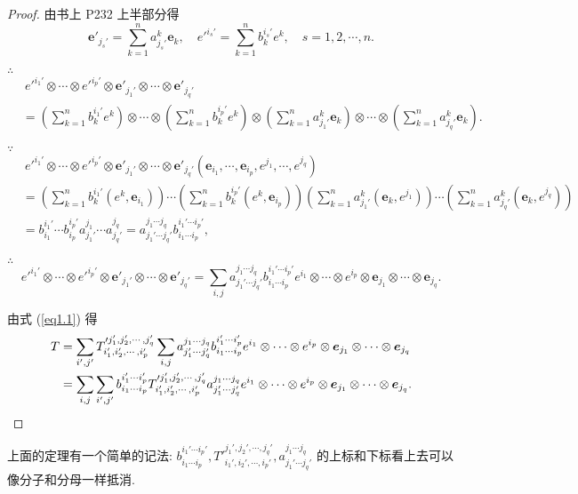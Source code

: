 \documentclass[color=black,device=normal,lang=cn,mode=geye]{elegantnote}
\begin{document}
\begin{proof}
    由书上 P232 上半部分得
    \[\boldsymbol{e}'_{j_s'}=\sum\limits_{k=1}^na_{j_s'}^k\boldsymbol{e}_k,\quad e'^{i_s'}=\sum\limits_{k=1}^nb_k^{i_s'}e^k,\quad s=1,2,\cdots,n.\]

    $\therefore$
    \begin{align*}
        & \ e'^{i_1'}\otimes\cdots\otimes e'^{i_p'}\otimes\boldsymbol{e}'_{j_1'}\otimes\cdots\otimes\boldsymbol{e}'_{j_q'} \\
        & =\left(\sum\limits_{k=1}^nb_k^{i_1'}e^k\right)\otimes\cdots\otimes\left(\sum\limits_{k=1}^nb_k^{i_p'}e^k\right)\otimes\left(\sum\limits_{k=1}^na_{j_1'}^k\boldsymbol{e}_k\right)\otimes\cdots\otimes\left(\sum\limits_{k=1}^na_{j_q'}^k\boldsymbol{e}_k\right).
    \end{align*}

    $\because$
    \begin{align*}
        & \ e'^{i_1'}\otimes\cdots\otimes e'^{i_p'}\otimes\boldsymbol{e}'_{j_1'}\otimes\cdots\otimes\boldsymbol{e}'_{j_q'}(\boldsymbol{e}_{i_1},\cdots,\boldsymbol{e}_{i_p},e^{j_1},\cdots,e^{j_q}) \\
        & =\left(\sum\limits_{k=1}^nb_k^{i_1'}(e^k,\boldsymbol{e}_{i_1})\right)\cdots\left(\sum\limits_{k=1}^nb_k^{i_p'}(e^k,\boldsymbol{e}_{i_p})\right)\left(\sum\limits_{k=1}^na_{j_1'}^k(\boldsymbol{e}_k,e^{j_1})\right)\cdots\left(\sum\limits_{k=1}^na_{j_q'}^k(\boldsymbol{e}_k,e^{j_q})\right) \\
        & =b^{i_1'}_{i_1}\cdots b^{i_p'}_{i_p}a^{j_1}_{j_1'}\cdots a^{j_q}_{j_q'}=a^{j_1\cdots j_q}_{j_1'\cdots j_q'}b^{i_1'\cdots i_p'}_{i_1\cdots i_p},
    \end{align*}

    $\therefore$
    \[e'^{i_1'}\otimes\cdots\otimes e'^{i_p'}\otimes\boldsymbol{e}'_{j_1'}\otimes\cdots\otimes\boldsymbol{e}'_{j_q'}=\sum\limits_{i,j}a^{j_1\cdots j_q}_{j_1'\cdots j_q'}b^{i_1'\cdots i_p'}_{i_1\cdots i_p}e^{i_1}\otimes\cdots\otimes e^{i_p}\otimes\boldsymbol{e}_{j_1}\otimes\cdots\otimes\boldsymbol{e}_{j_q}.\]

    由式 (\ref{eq1.1}) 得
    \begin{align*}
        T & =\sum\limits_{i',j'}T'^{j_1',j_2',\cdots,j_q'}_{i_1',i_2',\cdots,i_p'}\sum\limits_{i,j}a^{j_1\cdots j_q}_{j_1'\cdots j_q'}b^{i_1'\cdots i_p'}_{i_1\cdots i_p}e^{i_1}\otimes\cdots\otimes e^{i_p}\otimes\boldsymbol{e}_{j_1}\otimes\cdots\otimes\boldsymbol{e}_{j_q} \\
        & =\sum\limits_{i,j}\sum\limits_{i',j'}b^{i_1'\cdots i_p'}_{i_1\cdots i_p}T'^{j_1',j_2',\cdots,j_q'}_{i_1',i_2',\cdots,i_p'}a^{j_1\cdots j_q}_{j_1'\cdots j_q'}e^{i_1}\otimes\cdots\otimes e^{i_p}\otimes\boldsymbol{e}_{j_1}\otimes\cdots\otimes\boldsymbol{e}_{j_q}.\qedhere
    \end{align*}
\end{proof}
上面的定理有一个简单的记法: $b^{i_1'\cdots i_p'}_{i_1\cdots i_p},T'^{j_1',j_2',\cdots,j_q'}_{i_1',i_2',\cdots,i_p'},a^{j_1\cdots j_q}_{j_1'\cdots j_q'}$ 的上标和下标看上去可以像分子和分母一样抵消.
\end{document}
